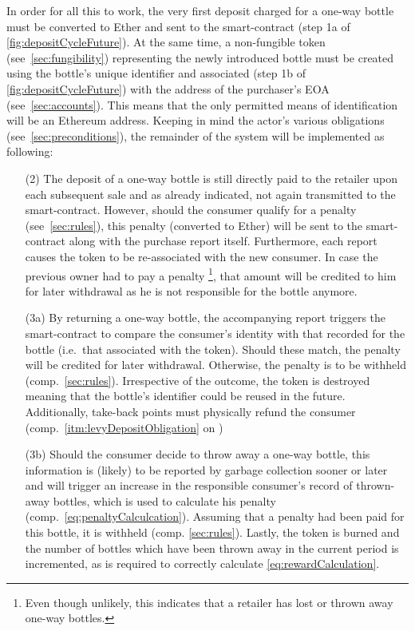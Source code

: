 In order for all this to work, the very first deposit charged for a one-way bottle must be converted to Ether and sent to the smart-contract (step 1a of \autoref{fig:depositCycleFuture})\label{itm:basicRequirement}. At the same time, a non-fungible token (see~\ref{sec:fungibility}) representing the newly introduced bottle must be created using the bottle's unique identifier and associated (step 1b of \autoref{fig:depositCycleFuture}) with the address of the purchaser's \ac{EOA} (see~\ref{sec:accounts}). This means that the only permitted means of identification will be an Ethereum address. Keeping in mind the actor's various obligations (see~\ref{sec:preconditions}), the remainder of the system will be implemented as following: 

\begin{itemize}
	\item [(2)] The deposit of a one-way bottle is still directly paid to the retailer upon each subsequent sale and as already indicated, not again transmitted to the smart-contract. However, should the consumer qualify for a penalty (see~\ref{sec:rules}), this penalty (converted to Ether) will be sent to the smart-contract along with the purchase report itself. Furthermore, each report causes the token to be re-associated with the new consumer. In case the previous owner had to pay a penalty \footnote{Even though unlikely, this indicates that a retailer has lost or thrown away one-way bottles.}, that amount will be credited to him for later withdrawal as he is not responsible for the bottle anymore.
	\item [(3a)] By returning a one-way bottle, the accompanying report triggers the smart-contract to compare the consumer's identity with that recorded for the bottle (i.e.~that associated with the token). Should these match, the penalty will be credited for later withdrawal. Otherwise, the penalty is to be withheld (comp.~\ref{sec:rules}). Irrespective of the outcome, the token is destroyed meaning that the bottle's identifier could be reused in the future. Additionally, take-back points must physically refund the consumer (comp.~\ref{itm:levyDepositObligation} on )
	\item [(3b)] Should the consumer decide to throw away a one-way bottle, this information is (likely) to be reported by garbage collection sooner or later and will trigger an increase in the responsible consumer's record of thrown-away bottles, which is used to calculate his penalty (comp.~\autoref{eq:penaltyCalculcation}). Assuming that a penalty had been paid for this bottle, it is withheld (comp. \ref{sec:rules}). Lastly, the token is burned and the number of bottles which have been thrown away in the current period is incremented, as is required to correctly calculate \autoref{eq:rewardCalculation}.

\end{itemize}
